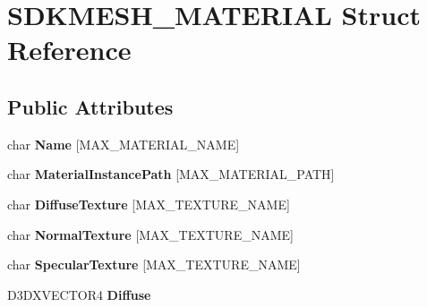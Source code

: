 \hypertarget{struct_s_d_k_m_e_s_h___m_a_t_e_r_i_a_l}{\section{S\+D\+K\+M\+E\+S\+H\+\_\+\+M\+A\+T\+E\+R\+I\+A\+L Struct Reference}
\label{struct_s_d_k_m_e_s_h___m_a_t_e_r_i_a_l}
}
\subsection*{Public Attributes}
\begin{DoxyCompactItemize}
\item 
\hypertarget{struct_s_d_k_m_e_s_h___m_a_t_e_r_i_a_l_af8b3ad650c79e927a4a4fbc6e0546027}{char {\bfseries Name} \mbox{[}M\+A\+X\+\_\+\+M\+A\+T\+E\+R\+I\+A\+L\+\_\+\+N\+A\+M\+E\mbox{]}}\label{struct_s_d_k_m_e_s_h___m_a_t_e_r_i_a_l_af8b3ad650c79e927a4a4fbc6e0546027}

\item 
\hypertarget{struct_s_d_k_m_e_s_h___m_a_t_e_r_i_a_l_a637ca9e238980efd2bb9c45c79ecccce}{char {\bfseries Material\+Instance\+Path} \mbox{[}M\+A\+X\+\_\+\+M\+A\+T\+E\+R\+I\+A\+L\+\_\+\+P\+A\+T\+H\mbox{]}}\label{struct_s_d_k_m_e_s_h___m_a_t_e_r_i_a_l_a637ca9e238980efd2bb9c45c79ecccce}

\item 
\hypertarget{struct_s_d_k_m_e_s_h___m_a_t_e_r_i_a_l_ad4995dddc376ab344049ec8580650edc}{char {\bfseries Diffuse\+Texture} \mbox{[}M\+A\+X\+\_\+\+T\+E\+X\+T\+U\+R\+E\+\_\+\+N\+A\+M\+E\mbox{]}}\label{struct_s_d_k_m_e_s_h___m_a_t_e_r_i_a_l_ad4995dddc376ab344049ec8580650edc}

\item 
\hypertarget{struct_s_d_k_m_e_s_h___m_a_t_e_r_i_a_l_a0347d1c63b0825e91bccf8853d01fd1f}{char {\bfseries Normal\+Texture} \mbox{[}M\+A\+X\+\_\+\+T\+E\+X\+T\+U\+R\+E\+\_\+\+N\+A\+M\+E\mbox{]}}\label{struct_s_d_k_m_e_s_h___m_a_t_e_r_i_a_l_a0347d1c63b0825e91bccf8853d01fd1f}

\item 
\hypertarget{struct_s_d_k_m_e_s_h___m_a_t_e_r_i_a_l_abd07212053f52102ed2f9c7a92fb8095}{char {\bfseries Specular\+Texture} \mbox{[}M\+A\+X\+\_\+\+T\+E\+X\+T\+U\+R\+E\+\_\+\+N\+A\+M\+E\mbox{]}}\label{struct_s_d_k_m_e_s_h___m_a_t_e_r_i_a_l_abd07212053f52102ed2f9c7a92fb8095}

\item 
\hypertarget{struct_s_d_k_m_e_s_h___m_a_t_e_r_i_a_l_a0c8ccc31e54adad65a0cc47dc89788dd}{D3\+D\+X\+V\+E\+C\+T\+O\+R4 {\bfseries Diffuse}}\label{struct_s_d_k_m_e_s_h___m_a_t_e_r_i_a_l_a0c8ccc31e54adad65a0cc47dc89788dd}


\end{DoxyCompactItemize}

